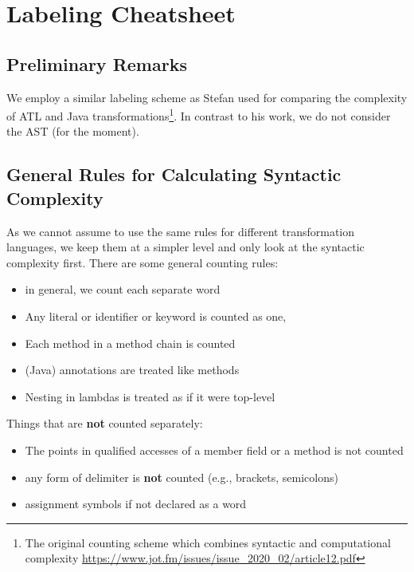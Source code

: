\documentclass{article}
\begin{document}
\section*{Labeling Cheatsheet} 
    \subsection*{Preliminary Remarks}
    We employ a similar labeling scheme as Stefan used for comparing the complexity of ATL and Java transformations\footnote{The original counting scheme which combines syntactic and computational complexity \url{https://www.jot.fm/issues/issue_2020_02/article12.pdf}}. In contrast to his work, we do not consider the AST (for the moment).

    \subsection*{General Rules for Calculating Syntactic Complexity}
    As we cannot assume to use the same rules for different transformation languages, we keep them at a simpler level and only look at the syntactic complexity first. 
    There are some general counting rules:
    
    \begin{itemize}[noitemsep]
        \item in general, we count each separate word
        \item Any literal or identifier or keyword is counted as one, 
        \item Each method in a method chain is counted %
        \item (Java) annotations are treated like methods %
        \item Nesting in lambdas is treated as if it were top-level
    \end{itemize}
     
     Things that are \textbf{not} counted separately:
     \begin{itemize}[noitemsep]
        \item The points in qualified accesses of a member field or a method is not counted
        \item any form of delimiter is \textbf{not} counted (e.g., brackets, semicolons)
        \item assignment symbols if not declared as a word
     \end{itemize}
     
\end{document}
